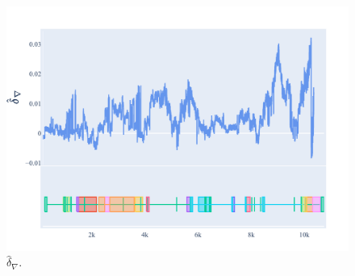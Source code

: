 \begin{figure}[htbp]
\centering
\includegraphics[width=\textwidth]{figures/plots/rodent/dconv-intron3.pdf}
\caption{$\hat\delta_\nabla$.}
\label{fig:rodent/d-conv/intron3}
\end{figure}